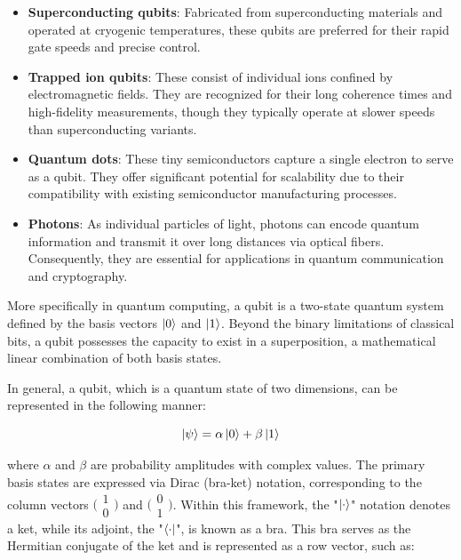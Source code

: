 \documentclass[en]{dimscthesis}
\begin{document}
\begin{itemize}
	\item \textbf{Superconducting qubits}: Fabricated from superconducting materials and operated at cryogenic temperatures, these qubits are preferred for their rapid gate speeds and precise control.
	\item \textbf{Trapped ion qubits}: These consist of individual ions confined by electromagnetic fields. They are recognized for their long coherence times and high-fidelity measurements, though they typically operate at slower speeds than superconducting variants.
	\item \textbf{Quantum dots}: These tiny semiconductors capture a single electron to serve as a qubit. They offer significant potential for scalability due to their compatibility with existing semiconductor manufacturing processes.
	\item \textbf{Photons}: As individual particles of light, photons can encode quantum information and transmit it over long distances via optical fibers. Consequently, they are essential for applications in quantum communication and cryptography.
	
\end{itemize}

More specifically in quantum computing, a qubit is a two-state quantum system defined by the basis vectors $\ket{0}$ and $\ket{1}$. Beyond the binary limitations of classical bits, a qubit possesses the capacity to exist in a superposition, a mathematical linear combination of both basis states.

In general, a qubit, which is a quantum state of two dimensions, can be represented in the following manner:

\begin{equation}
	\ket{\psi} = \alpha \ket{0} + \beta \ket{1}
	\label{eq:state}
\end{equation}

where $\alpha$ and $\beta$ are probability amplitudes with complex values. The primary basis states are expressed via Dirac (bra-ket) notation, corresponding to the column vectors $\bigl( \begin{smallmatrix} 1 \\ 0 \end{smallmatrix} \bigr)$ and $\bigl( \begin{smallmatrix} 0 \\ 1 \end{smallmatrix} \bigr)$. Within this framework, the "$\ket{\cdot}$" notation denotes a ket, while its adjoint, the "$\bra{\cdot}$", is known as a bra. This bra serves as the Hermitian conjugate of the ket and is represented as a row vector, such as:
\end{document}

